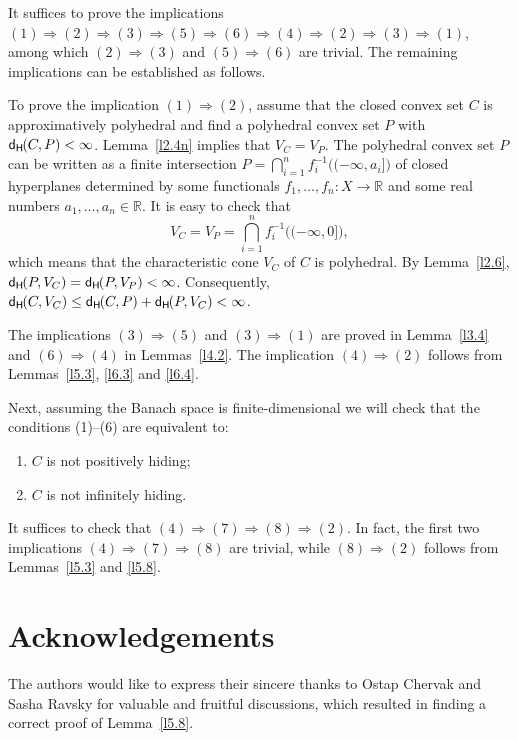 \documentclass{amsart}
\newcommand{\IR}{\mathbb R}
\newcommand{\Ra}{\Rightarrow}
\newcommand{\dH}{\mathsf{d}_{\mathsf H}\kern-1pt}
\theoremstyle{definition}
\begin{document}
It suffices to prove the implications $(1)\Ra(2)\Ra(3)\Ra(5)\Ra(6)\Ra(4)\Ra(2)\Ra(3)\Ra(1)$, among which $(2)\Ra(3)$ and $(5)\Ra(6)$ are trivial. The remaining implications can be established as follows.
\smallskip

To prove the implication $(1)\Ra(2)$, assume that the closed convex set $C$ is approximatively polyhedral and find a polyhedral convex set $P$ with $\dH(C,P)<\infty$. Lemma~\ref{l2.4n} implies that $V_C=V_P$. The polyhedral convex set $P$ can be written as a finite intersection $P=\bigcap_{i=1}^n f_i^{-1}\big((-\infty,a_i]\big)$ of closed hyperplanes determined by some functionals $f_1,\dots,f_n:X\to\IR$ and some real numbers $a_1,\dots,a_n\in\IR$. It is easy to check that $$V_C=V_P=\bigcap_{i=1}^n f_i^{-1}\big((-\infty,0]\big),$$
which means that the characteristic cone $V_C$ of $C$ is polyhedral. By Lemma~\ref{l2.6}, $\dH(P,V_C)=\dH(P,V_P)<\infty$. Consequently, $\dH(C,V_C)\le \dH(C,P)+\dH(P,V_C)<\infty$.
\smallskip

The implications $(3)\Ra(5)$ and $(3)\Ra(1)$ are proved in Lemma~\ref{l3.4} and $(6)\Ra(4)$ in Lemmas~\ref{l4.2}. The implication $(4)\Ra(2)$ follows from Lemmas~\ref{l5.3}, \ref{l6.3} and \ref{l6.4}.

Next, assuming the Banach space is finite-dimensional we will check that the conditions (1)--(6) are equivalent to:
\begin{enumerate}
\item[(7)] $C$ is not positively hiding;
\item[(8)] $C$ is not infinitely hiding.
\end{enumerate}

It suffices to check that $(4)\Ra(7)\Ra(8)\Ra (2)$. In fact, the first two implications $(4)\Ra(7)\Ra(8)$ are trivial, while $(8)\Ra(2)$ follows from Lemmas~\ref{l5.3} and \ref{l5.8}.

\section{Acknowledgements}

The authors would like to express their sincere thanks to Ostap Chervak and Sasha Ravsky for valuable and fruitful discussions, which resulted in finding a correct proof of Lemma~\ref{l5.8}.

\end{document}
